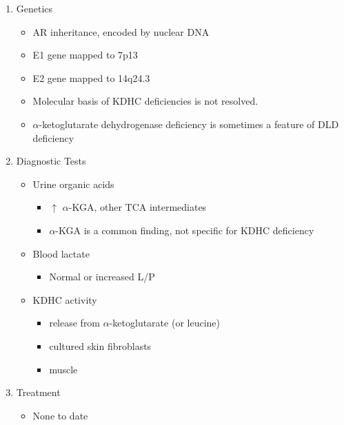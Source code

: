 \documentclass{scrartcl}
\begin{document}
\begin{enumerate}
\item Genetics
\label{sec:org2ecc4d9}
\begin{itemize}
\item AR inheritance, encoded by nuclear DNA
\item E1 gene mapped to 7p13
\item E2 gene mapped to 14q24.3
\item Molecular basis of KDHC deficiencies is not resolved.
\item \(\alpha\)-ketoglutarate dehydrogenase deficiency is sometimes a feature of DLD deficiency
\end{itemize}

\item Diagnostic Tests
\label{sec:org773f314}
\begin{itemize}
\item Urine organic acids
\begin{itemize}
\item \(\uparrow\) \(\alpha\)-KGA, \textpm{} other TCA intermediates
\item \(\alpha\)-KGA is a common finding, not specific for KDHC deficiency
\end{itemize}
\item Blood lactate
\begin{itemize}
\item Normal or increased L/P
\end{itemize}
\item KDHC activity
\begin{itemize}
\item {} release from \ce{[1-^14C]} \(\alpha\)-ketoglutarate (or \ce{[1-^14C]} leucine)
\item cultured skin fibroblasts
\item muscle
\end{itemize}
\end{itemize}

\item Treatment
\label{sec:org125d9b6}
\begin{itemize}
\item None to date
\end{itemize}
\end{enumerate}
\end{document}
